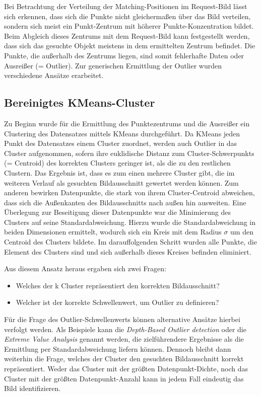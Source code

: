 \documentclass[
    type=Projektarbeit,
    status=draft, %
    language=german, %
    bibengine=bibtex,
]{unibwm-inf-thesis}
\begin{document}
    Bei Betrachtung der Verteilung der Matching-Positionen im Request-Bild lässt sich erkennen, dass sich die Punkte nicht gleichermaßen über das Bild verteilen, sondern sich meist ein Punkt-Zentrum mit höherer Punkte-Konzentration bildet.
    Beim Abgleich dieses Zentrums mit dem Request-Bild kann festgestellt werden, dass sich das gesuchte Objekt meistens in dem ermittelten Zentrum befindet.
    Die Punkte, die außerhalb des Zentrums liegen, sind somit fehlerhafte Daten oder Ausreißer (= Outlier).
    Zur generischen Ermittlung der Outlier wurden verschiedene Ansätze erarbeitet.

    \subsection{Bereinigtes KMeans-Cluster}
    Zu Beginn wurde für die Ermittlung des Punktezentrums und die Ausreißer ein Clustering des Datensatzes mittels KMeans durchgeführt.
    Da KMeans jeden Punkt des Datensatzes einem Cluster zuordnet, werden auch Outlier in das Cluster aufgenommen,
    sofern ihre euklidische Distanz zum Cluster-Schwerpunkts (= Centroid) des korrekten Clusters geringer ist, als die zu den restlichen Clustern.
    Das Ergebnis ist, dass es zum einen mehrere Cluster gibt, die im weiteren Verlauf als gesuchten Bildausschnitt gewertet werden können.
    Zum anderen bewirken Datenpunkte, die stark von ihrem Cluster-Centroid abweichen, dass sich die Außenkanten des Bildausschnitts nach außen hin ausweiten.
    Eine Überlegung zur Beseitigung dieser Datenpunkte war die Minimierung des Clusters auf seine Standardabweichung.
    Hierzu wurde die Standardabweichung in beiden Dimensionen ermittelt, wodurch sich ein Kreis mit dem Radius $\sigma$ um den Centroid des Clusters bildete.
    Im darauffolgenden Schritt wurden alle Punkte, die Element des Clusters sind und sich außerhalb dieses Kreises befinden eliminiert.

    Aus diesem Ansatz heraus ergaben sich zwei Fragen:
    \begin{itemize}
        \item Welches der k Cluster repräsentiert den korrekten Bildausschnitt?
        \item Welcher ist der korrekte Schwellenwert, um Outlier zu definieren?
    \end{itemize}

    Für die Frage des Outlier-Schwellenwerts können alternative Ansätze hierbei verfolgt werden.
    Als Beispiele kann die \textit{Depth-Based Outlier detection} oder die \textit{Extreme Value Analysis} genannt werden, die zielführendere Ergebnisse als die Ermittlung per Standardabweichung liefern können.
    Dennoch bleibt dann weiterhin die Frage, welches der Cluster den gesuchten Bildausschnitt korrekt repräsentiert.
    Weder das Cluster mit der größten Datenpunkt-Dichte, noch das Cluster mit der größten Datenpunkt-Anzahl kann in jedem Fall eindeutig das Bild identifizieren.
\end{document}
